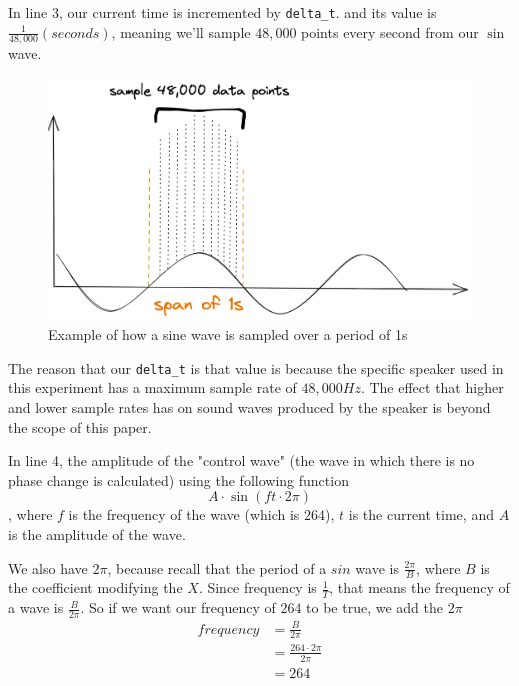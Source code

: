 \documentclass[index]{subfiles}
\begin{document}
In line 3, our current time is incremented by \verb+delta_t+. and its value is \(\frac{1}{48,000}(seconds)\), meaning we'll sample \(48,000\) points every second from our \(\sin\) wave.

\begin{figure}[H]
    \centering
    \includegraphics[scale=0.15]{sampling.png}
    \caption{Example of how a sine wave is sampled over a period of 1s}
\end{figure}

The reason that our \verb+delta_t+ is that value is because the specific speaker used in this experiment has a maximum sample rate of \(48,000Hz\). The effect that higher and lower sample rates has on sound waves produced by the speaker is beyond the scope of this paper.

In line 4, the amplitude of the "control wave" (the wave in which there is no phase change is calculated) using the following function
\begin{equation*}
    A\cdot\sin\left(ft\cdot2\pi\right)
\end{equation*}, where \(f\) is the frequency of the wave (which is \(264\)), \(t\) is the current time, and \(A\) is the amplitude of the wave.

We also have \(2\pi\), because recall that the period of a \(sin\) wave is \(\frac{2\pi}{B}\), where \(B\) is the coefficient modifying the \(X\). Since frequency is \(\frac{1}{T}\), that means the frequency of a wave is \(\frac{B}{2\pi}\). So if we want our frequency of \(264\) to be true, we add the \(2\pi\)
\begin{align*}
    frequency & =\frac{B}{2\pi}            \\
              & =\frac{264\cdot2\pi}{2\pi} \\
              & =264
\end{align*}
\end{document}
